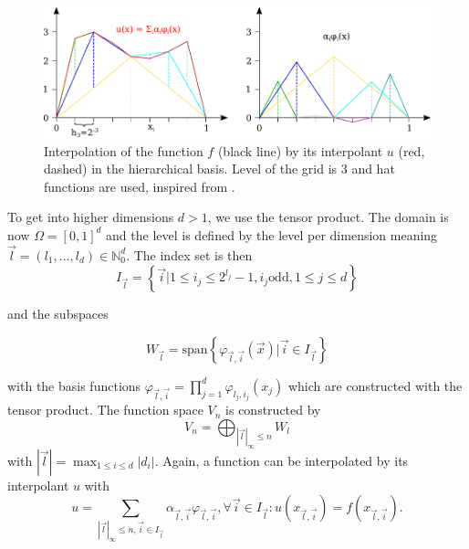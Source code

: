 \begin{figure}[H]
	\centering
	\includegraphics[width=\textwidth]{figures/Fig_2_7_hierarchical}
	\caption{ Interpolation of the function $ f $ (black line) by its interpolant $ u $ (red, dashed) in the hierarchical basis. Level of the grid is 3 and hat functions are used, inspired from \cite{pfluger2010spatially}.}
	\label{fig:weighted_sum_hierarchical}
\end{figure}

To get into higher dimensions $ d > 1 $, we use the tensor product. The domain is now $ \Omega = [0,1]^d $ and the level is defined by the level per dimension meaning $ \vec{l} = (l_1, ..., l_d) \in \mathbb{N}_0^d $. The index set is then
\begin{equation}
	I_{\vec{l}} = \left\{ \vec{i} | 1 \le i_j \le 2^{l_j} -1 , i_j \text{odd}, 1 \le j \le d \right\}
\end{equation}

and the subspaces 

\begin{equation}
	W_{\vec{l}} = \text{span}\left\{ \varphi_{\vec{l},\vec{i}}( \vec{x} ) | \vec{i} \in I_{\vec{l}}\right\}
\end{equation}

with the basis functions $ \varphi_{\vec{l},\vec{i}} = \prod_{j=1}^{d} \varphi_{l_j,i_j}(x_j) $ which are constructed with the tensor product. The function space $ V_n $ is constructed by
\begin{equation}
	V_n = \bigoplus_{\left|\vec{l}\right|_\infty \le n} W_l
\end{equation}
with $ \left|\vec{l}\right| = \max_{1 \le i \le d} \left|d_i\right| $. Again, a function can be interpolated by its interpolant $ u $ with
\begin{equation}
	u = \sum_{\left|\vec{l}\right|_\infty \le n, \vec{i} \in I_{\vec{l}}}\alpha_{\vec{l},\vec{i}} \varphi_{\vec{l},\vec{i}}, \forall \vec{i} \in I_{\vec{l}}: u\left(x_{\vec{l},\vec{i}}\right) = f\left(x_{\vec{l},\vec{i}}\right).
\end{equation}

